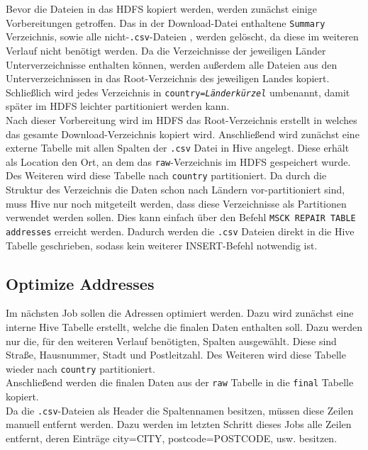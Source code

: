 \documentclass[
	a4paper,
	12p,
	bibliography=totocnumbered
]{scrartcl}
\begin{document}
Bevor die Dateien in das HDFS kopiert werden, werden zunächst einige Vorbereitungen getroffen. Das in der Download-Datei enthaltene \texttt{Summary} Verzeichnis, sowie alle \glqq nicht-\texttt{.csv}-Dateien \grqq{}, werden gelöscht, da diese im weiteren Verlauf nicht benötigt werden. Da die Verzeichnisse der jeweiligen Länder Unterverzeichnisse enthalten können, werden außerdem alle Dateien aus den Unterverzeichnissen in das Root-Verzeichnis des jeweiligen Landes kopiert. Schließlich wird jedes Verzeichnis in \texttt{country=\textit{Länderkürzel}} umbenannt, damit später im HDFS leichter partitioniert werden kann.\\

Nach dieser Vorbereitung wird im HDFS das Root-Verzeichnis erstellt in welches das gesamte Download-Verzeichnis kopiert wird. Anschließend wird zunächst eine externe Tabelle mit allen Spalten der \texttt{.csv} Datei  in Hive angelegt. Diese erhält als Location den Ort, an dem das \texttt{raw}-Verzeichnis im HDFS gespeichert wurde. Des Weiteren wird diese Tabelle nach \texttt{country} partitioniert. Da durch die Struktur des Verzeichnis die Daten schon nach Ländern vor-partitioniert sind, muss Hive nur noch mitgeteilt werden, dass diese Verzeichnisse als Partitionen verwendet werden sollen. Dies kann einfach über den Befehl \texttt{MSCK REPAIR TABLE addresses} erreicht werden. Dadurch werden die \texttt{.csv} Dateien direkt in die Hive Tabelle geschrieben, sodass kein weiterer INSERT-Befehl notwendig ist.


\subsection{Optimize Addresses}

Im nächsten Job sollen die Adressen optimiert werden. Dazu wird zunächst eine interne Hive Tabelle erstellt, welche die finalen Daten enthalten soll. Dazu werden nur die, für den weiteren Verlauf benötigten, Spalten ausgewählt. Diese sind Straße, Hausnummer, Stadt und Postleitzahl. Des Weiteren wird diese Tabelle wieder nach \texttt{country} partitioniert.\\

Anschließend werden die finalen Daten aus der \texttt{raw} Tabelle in die \texttt{final} Tabelle kopiert. \\

Da die \texttt{.csv}-Dateien als Header die Spaltennamen besitzen, müssen diese Zeilen manuell entfernt werden. Dazu werden im letzten Schritt dieses Jobs alle Zeilen entfernt, deren Einträge city=\glqq CITY\grqq{}, postcode=\glqq POSTCODE\grqq{}, usw. besitzen.
\end{document}
